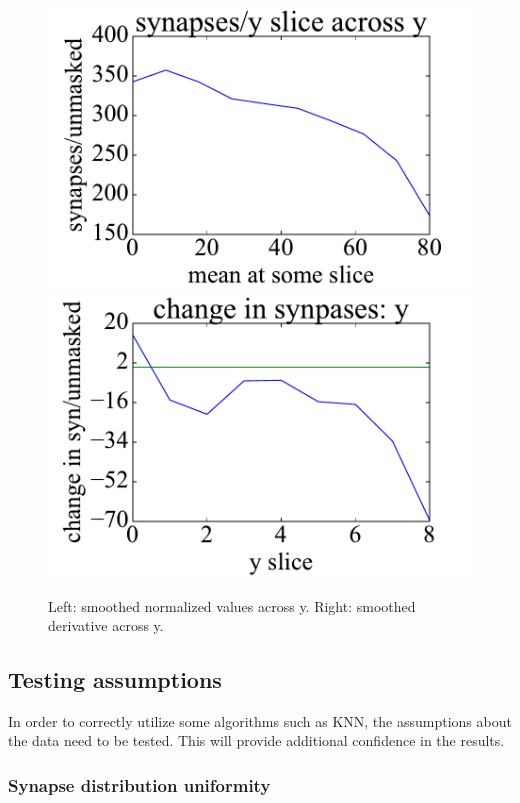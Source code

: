 \documentclass{article}
\begin{document}
\begin{figure}[h]
  \centering
  \includegraphics[scale=.3]{Fig8a}
  \includegraphics[scale=.3]{Fig8b}
  \caption{Left: smoothed normalized values across y. Right: smoothed derivative across y.}
\end{figure}

\subsection{Testing assumptions}

In order to correctly utilize some algorithms such as KNN, the assumptions about the data need to be tested. This will provide additional confidence in the results. 

\subsubsection{Synapse distribution uniformity}
\end{document}
